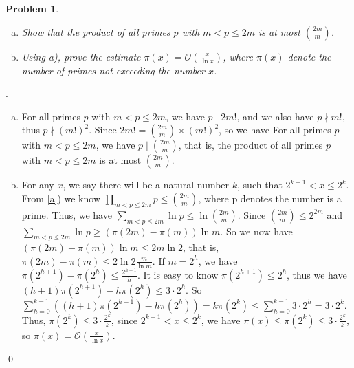 \documentclass[12pt]{article}
\newtheorem{hw}{Problem}
\newenvironment{sol}
  {\par\vspace{3mm}\noindent{\it Solution}.}
  {\qed}
\begin{document}
\begin{hw}
\hspace{1mm}
\begin{enumerate}[a)]
  \item Show that the product of all primes $p$ with $m<p\leq 2m$ is at most ${2m\choose m}$.
  \item Using a), prove the estimate $\pi(x)=\mathcal{O}(\frac{x}{\ln x})$, where $\pi(x)$ denote the number of primes not exceeding the number $x$.
\end{enumerate}

\end{hw}
\begin{sol}
	\begin{enumerate}[a)]
		\item \label{a} For all primes $p$ with $m < p \leq 2m$, we have $p\mid 2m!$, and we also have $p \nmid m!$, thus $p \nmid (m!)^2$. Since $2m! = {2m \choose m} \times (m!)^{2}$, so we have For all primes $p$ with $m < p \leq 2m$, we have $p\mid {2m \choose m}$, that is, the product of all primes $p$ with $m<p\leq 2m$ is at most ${2m\choose m}$.
		
		\item For any $x$, we say there will be a natural number $k$, such that $2^{k-1} < x \leq 2^{k}$. From \ref{a}) we know $\prod_{m < p \leq 2m}p \leq {2m \choose m}$, where p denotes the number is a prime. Thus, we have $\sum_{m < p \leq 2m}\ln p \leq \ln {2m \choose m}$. Since ${2m \choose m} \leq 2^{2m}$ and $\sum_{m < p \leq 2m}\ln p \geq  (\pi(2m) - \pi(m))\ln m$. So we now have $(\pi(2m) - \pi(m))\ln m \leq 2m\ln 2$, that is, $ \pi(2m) - \pi(m) \leq 2 \ln 2 \frac{m}{\ln m}$. If $m = 2^{h}$, we have $\pi(2^{h+1}) - \pi(2^{h}) \leq \frac{2^{h+1}}{h}$. It is easy to know $\pi(2^{h+1}) \leq 2^{h}$, thus we have $(h+1)\pi(2^{h+1}) - h\pi(2^{h}) \leq 3\cdot2^{h}$. So $\sum_{h = 0}^{k-1}((h+1)\pi(2^{h+1}) - h\pi(2^{h})) = k\pi(2^{k}) \leq \sum_{h = 0}^{k - 1}3\cdot2^{h} = 3\cdot2^{k}$. Thus, $\pi(2^{k}) \leq 3\cdot \frac{2^k}{k}$, since $2^{k-1} < x \leq 2^{k}$, we have $\pi(x) \leq \pi(2^k) \leq 3\cdot \frac{2^k}{k}$, so $\pi(x)=\mathcal{O}(\frac{x}{\ln x})$.
	\end{enumerate}
\end{sol}
\end{document}
